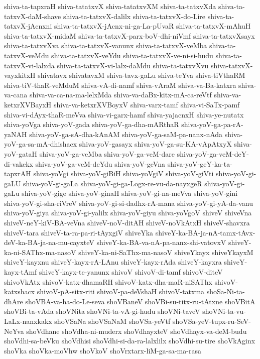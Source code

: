 {shiva-ta-tapxraH
shiva-tatatxvX
shiva-tatatxvXM
shiva-ta-tatxvXda
shiva-ta-tatxvX-daM-shave
shiva-ta-tatxvX-dalilx
shiva-ta-tatxvX-do-Lire
shiva-ta-tatxvX-jAcnxni
shiva-ta-tatxvX-jAcnx-ni-ga-La-pUvaR
shiva-ta-tatxvX-mAhuH
shiva-ta-tatxvX-midaM
shiva-ta-tatxvX-parx-boV-dhi-niVmf
shiva-ta-tatxvXsayx
shiva-ta-tatxvXva
shiva-ta-tatxvX-vanunx
shiva-ta-tatxvX-veMba
shiva-ta-tatxvX-veMdu
shiva-ta-tatxvX-veYdu
shiva-ta-tatxvX-ve-ni-si-hudu
shiva-ta-tatxvX-vi-lalxda
shiva-ta-tatxvX-vi-lalx-daMdu
shiva-ta-tatxvXvu
shiva-tatxvX-vayxkitxH
shivatavx
shivatavxM
shiva-tavx-gaLu
shiva-teYva
shiva-tiVthaRM
shiva-tiV-thaR-veMduM
shiva-vA-di-namf
shiva-vAraM
shiva-va-Ba-katxra
shiva-va-cana
shiva-va-ca-na-ma-lelxMda
shiva-va-daBx-kitx-mA-ca-reVtf
shiva-va-ketxrXVBayxH
shiva-va-ketxrXVBoyxV
shiva-varx-tamf
shiva-vi-SaTx-pamf
shiva-vi-dAyx-thaR-meVva
shiva-vi-garx-hamf
shiva-yajacnxH
shiva-ye-nutatx
shiva-yoVga
shiva-yoV-gada
shiva-yoV-ga-dha-mARthaR
shiva-yoV-ga-pa-rA-yaNAH
shiva-yoV-ga-sA-dha-kAnAM
shiva-yoV-ga-saM-pa-nanx-nAda
shiva-yoV-ga-sa-mA-dhishacx
shiva-yoV-gasayx
shiva-yoV-ga-su-KA-vApAtxyX
shiva-yoV-gataH
shiva-yoV-ga-veMba
shiva-yoV-ga-veM-dare
shiva-yoV-ga-veM-deY-di-vakekx
shiva-yoV-ga-veM-deYdu
shiva-yoV-geVna
shiva-yoV-geY-ka-ta-tapxrAH
shiva-yoVgi
shiva-yoV-giBiH
shiva-yoVgiV
shiva-yoV-giVti
shiva-yoV-gi-gaLU
shiva-yoV-gi-gaLa
shiva-yoV-gi-ga-Logx-re-vu-da-nayxgeR
shiva-yoV-gi-gaLu
shiva-yoV-gige
shiva-yoV-ginaH
shiva-yoV-gi-na-meVva
shiva-yoV-gini
shiva-yoV-gi-sha-riVreV
shiva-yoV-gi-si-dadhx-rA-mana
shiva-yoV-gi-yA-da-vanu
shiva-yoV-giya
shiva-yoV-gi-yalilx
shiva-yoV-giyu
shiva-yoVgoV
shiveV
shiveVna
shiveV-neY-kiV-BA-veVna
shiveV-noV-ditAH
shiveV-noVkAtxH
shiveV-shavxra
shiveV-tara
shiveV-ta-ra-pa-ri-tAyxgiV
shiveYka
shiveY-ka-BA-ja-nA-tamx-tAvx-deV-ka-BA-ja-na-mu-cayxteV
shiveY-ka-BA-va-nA-pa-nanx-shi-vatovxV
shiveY-ka-ni-SAThx-ma-nasoV
shiveY-ka-ni-SaThx-ma-nasoV
shiveYkayx
shiveYkayxM
shiveY-kayxnu
shiveY-kayx-rA-LAnu
shiveY-kayx-rAda
shiveY-kayxra
shiveY-kayx-tAmf
shiveY-kayx-te-yanunx
shivoV
shivoV-di-tamf
shivoV-diteV
shivoVkAtx
shivoV-katx-dhamaRH
shivoV-katx-dha-maR-niSAThx
shivoV-katxshacx
shivoV-pA-sitx-riti
shivoV-pa-deVshaH
shivoV-tatxma
shoSa-Ni-ta-dhAre
shoVBA-va-ha-do-Le-seva
shoVBaneV
shoVBi-su-titx-ru-tAtxne
shoVBitA
shoVBi-ta-vAda
shoVNita
shoVNi-ta-vA-gi-hudu
shoVNi-taveV
shoVNi-ta-vu-LaLx-nanxkakx
shoVSaNa
shoVSaNaM
shoVSa-yeVtf
shoVSa-yeV-tupx-ru-SeV-NeYva
shoVdhane
shoVdha-ni-muderx
shoVdhayxteV
shoVdhayx-va-deM-budu
shoVdhi-sa-beVku
shoVdhisi
shoVdhi-si-da-ra-lalxlilx
shoVdhi-su-tire
shoVkAginx
shoVka
shoVka-moVhw
shoVkoV
shoVrxtarx-liM-ga-sa-ma-rasa
}
